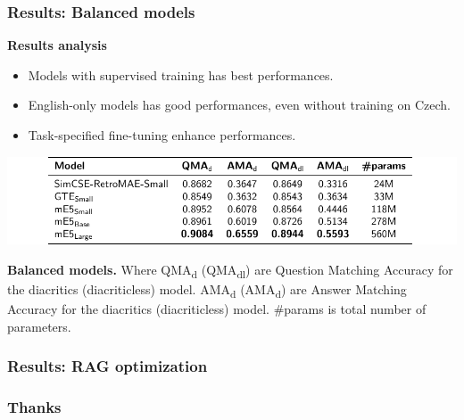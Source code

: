 \documentclass{beamer}
\begin{document}
\begin{frame}
  \frametitle{Results: Balanced models}
  \textcolor{cvut_navy}{\textbf{Results analysis}}
  \begin{itemize}
    \item Models with supervised training has best performances.
    \item English-only models has good performances, even without training on Czech.
    \item Task-specified fine-tuning enhance performances.
  \end{itemize}
  \begin{table}
    \centering
    \includegraphics[scale=0.8]{src/fig/pdfs/tables/balanced.pdf}
    \caption{\textcolor{cvut_navy}{\textbf{Balanced models.}}
    Where QMA\textsubscript{d} (QMA\textsubscript{dl}) are Question Matching Accuracy for the diacritics (diacriticless) model.
    AMA\textsubscript{d} (AMA\textsubscript{d}) are Answer Matching Accuracy for the diacritics (diacriticless) model.
    \#params is total number of parameters.}
  \end{table}
\end{frame}

\begin{frame}
  \frametitle{Results: RAG optimization}
\end{frame}

\begin{frame}
  \frametitle{Thanks}
\end{frame}
\end{document}
